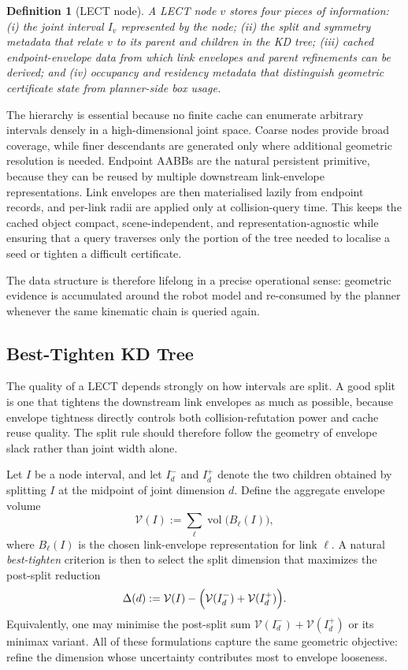 \documentclass[journal]{IEEEtran}
\newtheorem{definition}{Definition}
\begin{document}
\begin{definition}[LECT node]
A LECT node $v$ stores four pieces of information: (i) the joint interval
$I_v$ represented by the node; (ii) the split and symmetry metadata that relate
$v$ to its parent and children in the KD tree; (iii) cached endpoint-envelope
data from which link envelopes and parent refinements can be derived; and
(iv) occupancy and residency metadata that distinguish geometric certificate
state from planner-side box usage.
\end{definition}

The hierarchy is essential because no finite cache can enumerate arbitrary
intervals densely in a high-dimensional joint space. Coarse nodes provide broad
coverage, while finer descendants are generated only where additional geometric
resolution is needed. Endpoint AABBs are the natural persistent primitive,
because they can be reused by multiple downstream link-envelope
representations. Link envelopes are then materialised lazily from endpoint
records, and per-link radii are applied only at collision-query time. This
keeps the cached object compact, scene-independent, and representation-agnostic
while ensuring that a query traverses only the portion of the tree needed to
localise a seed or tighten a difficult certificate.

The data structure is therefore lifelong in a precise operational sense:
geometric evidence is accumulated around the robot model and re-consumed by the
planner whenever the same kinematic chain is queried again.

\subsection{Best-Tighten KD Tree}
\label{sec:lect_split}

The quality of a LECT depends strongly on how intervals are split. A good split
is one that tightens the downstream link envelopes as much as possible, because
envelope tightness directly controls both collision-refutation power and cache
reuse quality. The split rule should therefore follow the geometry of envelope
slack rather than joint width alone.

Let $I$ be a node interval, and let $I_d^{-}$ and $I_d^{+}$ denote the two
children obtained by splitting $I$ at the midpoint of joint dimension $d$.
Define the aggregate envelope volume
\[
\mathcal{V}(I) := \sum_{\ell} \operatorname{vol}\bigl(B_\ell(I)\bigr),
\]
where $B_\ell(I)$ is the chosen link-envelope representation for link $\ell$.
A natural \emph{best-tighten} criterion is then to select the split dimension
that maximizes the post-split reduction
\[
\Delta(d) := \mathcal{V}(I)
- \Bigl(\mathcal{V}(I_d^{-}) + \mathcal{V}(I_d^{+})\Bigr).
\]
Equivalently, one may minimise the post-split sum
$\mathcal{V}(I_d^{-}) + \mathcal{V}(I_d^{+})$ or its minimax variant. All of
these formulations capture the same geometric objective: refine the dimension
whose uncertainty contributes most to envelope looseness.
\end{document}
